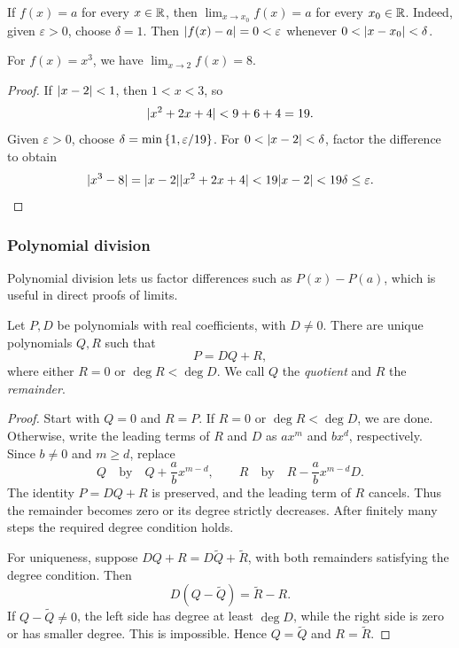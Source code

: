 \documentclass[11pt,a4paper]{amsart}
\begin{document}
\begin{example}
  If \(f(x)=a\) for every \(x\in\mathbb{R}\), then
  \(\lim_{x\to x_0}f(x)=a\) for every \(x_0\in\mathbb{R}\).
  Indeed, given \(\varepsilon>0\), choose \(\delta=1\). Then
  \(\lvert f(x)-a\rvert=0<\varepsilon\) whenever
  \(0<\lvert x-x_0\rvert<\delta\).
\end{example}

\begin{example}
  For \(f(x)=x^3\), we have \(\lim_{x\to2}f(x)=8\).
\end{example}

\begin{proof}
  If \(\lvert x-2\rvert<1\), then \(1<x<3\), so
  \[
    \lvert x^2+2x+4\rvert<9+6+4=19.
  \]
  Given \(\varepsilon>0\), choose
  \(\delta=\min\left\lbrace1,\varepsilon/19\right\rbrace\). For
  \(0<\lvert x-2\rvert<\delta\), factor the difference to obtain
  \[
    \lvert x^3-8\rvert=\lvert x-2\rvert\lvert x^2+2x+4\rvert
    <19\lvert x-2\rvert<19\delta\leq\varepsilon.
  \]
\end{proof}

\subsubsection{Polynomial division}

Polynomial division lets us factor differences such as \(P(x)-P(a)\),
which is useful in direct proofs of limits.

\begin{theorem}\label{thm:polynomial-division}
  Let \(P,D\) be polynomials with real coefficients, with \(D\neq0\).
  There are unique polynomials \(Q,R\) such that
  \[
    P=DQ+R,
  \]
  where either \(R=0\) or \(\deg R<\deg D\).
  We call \(Q\) the \emph{quotient} and \(R\) the \emph{remainder}.
\end{theorem}

\begin{proof}
  Start with \(Q=0\) and \(R=P\). If \(R=0\) or
  \(\deg R<\deg D\), we are done. Otherwise, write the leading terms
  of \(R\) and \(D\) as \(ax^m\) and \(bx^d\), respectively.
  Since \(b\neq0\) and \(m\geq d\), replace
  \[
    Q\quad\text{by}\quad Q+\frac{a}{b}x^{m-d},
    \qquad
    R\quad\text{by}\quad R-\frac{a}{b}x^{m-d}D.
  \]
  The identity \(P=DQ+R\) is preserved, and the leading term of
  \(R\) cancels. Thus the remainder becomes zero or its degree
  strictly decreases. After finitely many steps the required degree
  condition holds.

  For uniqueness, suppose \(DQ+R=D\widetilde Q+\widetilde R\),
  with both remainders satisfying the degree condition. Then
  \[
    D(Q-\widetilde Q)=\widetilde R-R.
  \]
  If \(Q-\widetilde Q\neq0\), the left side has degree at least
  \(\deg D\), while the right side is zero or has smaller degree.
  This is impossible. Hence \(Q=\widetilde Q\) and \(R=\widetilde R\).
\end{proof}
\end{document}
